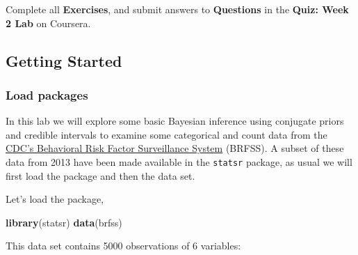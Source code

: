 \documentclass[
]{article}
\author{}
\date{\vspace{-2.5em}}
\newenvironment{Shaded}{\begin{snugshade}}{\end{snugshade}}
\newcommand{\KeywordTok}[1]{\textcolor[rgb]{0.13,0.29,0.53}{\textbf{#1}}}
\newcommand{\NormalTok}[1]{#1}
\begin{document}
Complete all \textbf{Exercises}, and submit answers to
\textbf{Questions} in the \textbf{Quiz: Week 2 Lab} on Coursera.

\hypertarget{getting-started}{%
\subsection{Getting Started}\label{getting-started}}

\hypertarget{load-packages}{%
\subsubsection{Load packages}\label{load-packages}}

In this lab we will explore some basic Bayesian inference using
conjugate priors and credible intervals to examine some categorical and
count data from the \href{http://www.cdc.gov/brfss/}{CDC's Behavioral
Risk Factor Surveillance System} (BRFSS). A subset of these data from
2013 have been made available in the \texttt{statsr} package, as usual
we will first load the package and then the data set.

Let's load the package,

\begin{Shaded}
\begin{Highlighting}[]
\KeywordTok{library}\NormalTok{(statsr)}
\KeywordTok{data}\NormalTok{(brfss)}
\end{Highlighting}
\end{Shaded}

This data set contains 5000 observations of 6 variables:
\end{document}
